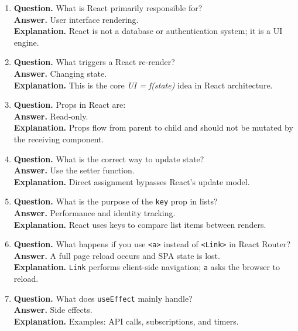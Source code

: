 \documentclass[11pt,a4paper]{article}
\begin{document}
\begin{enumerate}
  \item \textbf{Question.} What is React primarily responsible for?\\
  \textbf{Answer.} User interface rendering.\\
  \textbf{Explanation.} React is not a database or authentication system; it is a UI engine.

  \item \textbf{Question.} What triggers a React re-render?\\
  \textbf{Answer.} Changing state.\\
  \textbf{Explanation.} This is the core \emph{UI = f(state)} idea in React architecture.

  \item \textbf{Question.} Props in React are: \\
  \textbf{Answer.} Read-only.\\
  \textbf{Explanation.} Props flow from parent to child and should not be mutated by the receiving component.

  \item \textbf{Question.} What is the correct way to update state?\\
  \textbf{Answer.} Use the setter function.\\
  \textbf{Explanation.} Direct assignment bypasses React's update model.

  \item \textbf{Question.} What is the purpose of the \texttt{key} prop in lists?\\
  \textbf{Answer.} Performance and identity tracking.\\
  \textbf{Explanation.} React uses keys to compare list items between renders.

  \item \textbf{Question.} What happens if you use \texttt{<a>} instead of \texttt{<Link>} in React Router?\\
  \textbf{Answer.} A full page reload occurs and SPA state is lost.\\
  \textbf{Explanation.} \texttt{Link} performs client-side navigation; \texttt{a} asks the browser to reload.

  \item \textbf{Question.} What does \texttt{useEffect} mainly handle?\\
  \textbf{Answer.} Side effects.\\
  \textbf{Explanation.} Examples: API calls, subscriptions, and timers.


\end{enumerate}
\end{document}
